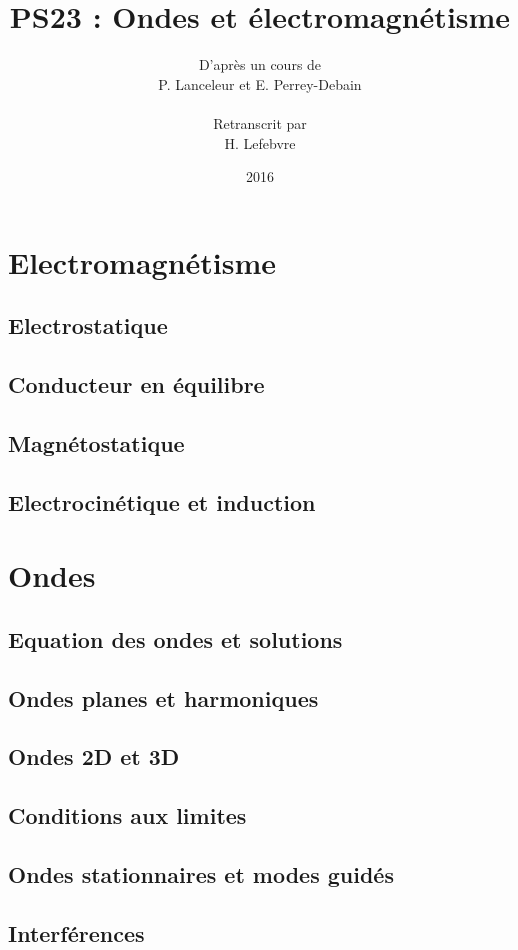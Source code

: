 \documentclass[a4paper,3cm]{report}
\title{PS23 : Ondes et électromagnétisme}
\author{D'après un cours de\\
P. Lanceleur et E. Perrey-Debain\\\\
Retranscrit par\\
H. Lefebvre}
\date{2016}
\begin{document}
\maketitle
\tableofcontents

\part{Electromagnétisme}

\chapter{Electrostatique}


\chapter{Conducteur en équilibre}


\chapter{Magnétostatique}


\chapter{Electrocinétique et induction}


\part{Ondes}

\chapter{Equation des ondes et solutions}


\chapter{Ondes planes et harmoniques}


\chapter{Ondes 2D et 3D}


\chapter{Conditions aux limites}


\chapter{Ondes stationnaires et modes guidés}


\chapter{Interférences}

\end{document}
